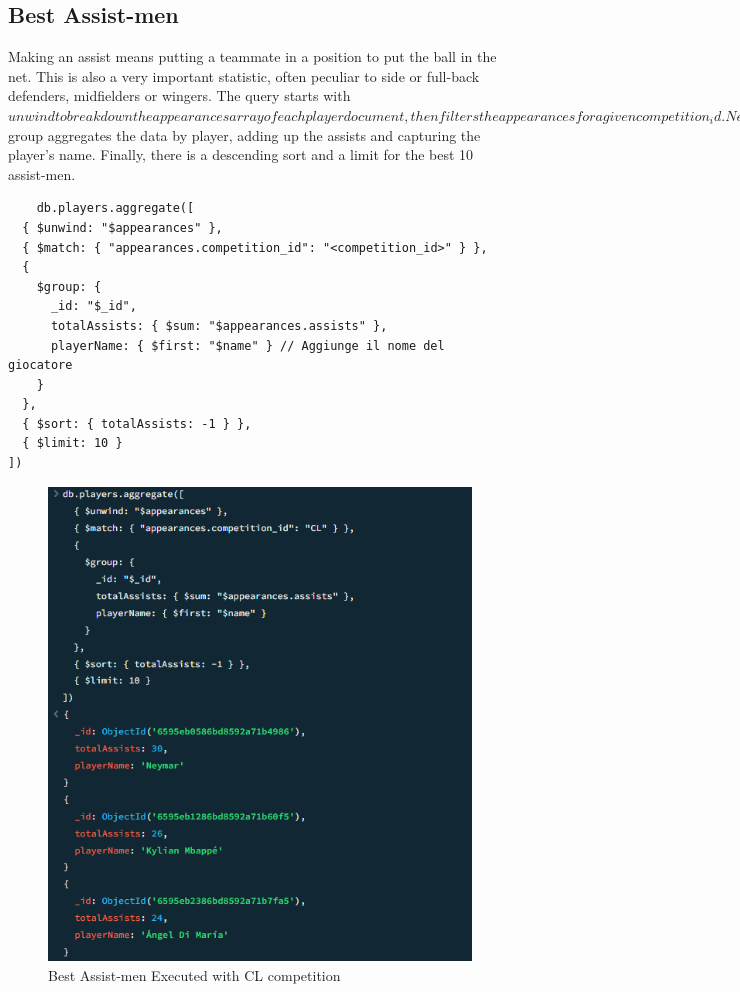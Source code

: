 \documentclass{Configuration_Files/PoliMi3i_thesis}
\begin{document}
\begin{itemize}
\end{itemize}

\subsection{Best Assist-men}
Making an assist means putting a teammate in a position to put the ball in the net. This is also a very important statistic, often peculiar to side or full-back defenders, midfielders or wingers. The query starts with $unwind to break down the appearances array of each player document, then filters the appearances for a given competition_id. Next, $group aggregates the data by player, adding up the assists and capturing the player's name. Finally, there is a descending sort and a limit for the best 10 assist-men.

\begin{verbatim}
    db.players.aggregate([
  { $unwind: "$appearances" },
  { $match: { "appearances.competition_id": "<competition_id>" } },
  { 
    $group: {
      _id: "$_id",
      totalAssists: { $sum: "$appearances.assists" },
      playerName: { $first: "$name" } // Aggiunge il nome del giocatore
    }
  },
  { $sort: { totalAssists: -1 } },
  { $limit: 10 }
])

\end{verbatim}
\begin{figure}[htbp]
    \centering
    \includegraphics[scale=0.6]{Images/Queries/Competitions_statistics/best-assistmen/CL.png}
    \caption{Best Assist-men Executed with CL competition}
\end{figure}
\newpage
\end{document}
